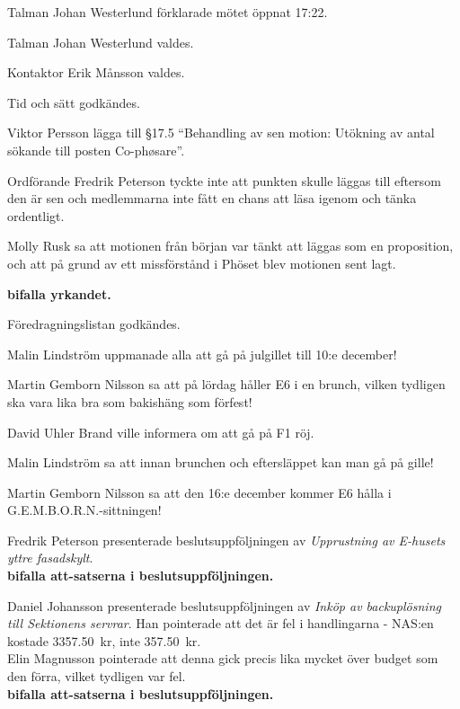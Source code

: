 \documentclass[10pt]{article}
\def\mo{Johan Westerlund}
\def\ms{Erik Månsson}
\begin{document}
\begin{paragrafer}
Talman {\mo} förklarade mötet öppnat 17:22.

Talman {\mo} valdes.

Kontaktor {\ms} valdes.

Tid och sätt godkändes.

\valavj


Viktor Persson \ypa lägga till \S17.5 ``Behandling av sen motion: Utökning av antal sökande till posten Co-phøsare''.

Ordförande Fredrik Peterson tyckte inte att punkten skulle läggas till eftersom den är sen och medlemmarna inte fått en chans att läsa igenom och tänka ordentligt.

Molly Rusk sa att motionen från början var tänkt att läggas som en proposition, och att på grund av ett missförstånd i Phöset blev motionen sent lagt.

\textbf{\Mba bifalla yrkandet.}

Föredragningslistan godkändes.


Malin Lindström uppmanade alla att gå på julgillet till 10:e december!

Martin Gemborn Nilsson sa att på lördag håller E6 i en brunch, vilken tydligen ska vara lika bra som bakishäng som förfest!

David Uhler Brand ville informera om att gå på F1 röj.

Malin Lindström sa att innan brunchen och eftersläppet kan man gå på gille!

Martin Gemborn Nilsson sa att den 16:e december kommer E6 hålla i G.E.M.B.O.R.N.-sittningen!

Fredrik Peterson presenterade beslutsuppföljningen av \emph{Upprustning av E-husets yttre fasadskylt}.\\
\textbf{\Mba bifalla att-satserna i beslutsuppföljningen.}

Daniel Johansson presenterade beslutsuppföljningen av \emph{Inköp av backuplösning till Sektionens servrar}. Han pointerade att det är fel i handlingarna - NAS:en kostade \SI{3357.50}{kr}, inte \SI{357.50}{kr}.\\
Elin Magnusson pointerade att denna gick precis lika mycket över budget som den förra, vilket tydligen var fel.\\ %
\textbf{\Mba bifalla att-satserna i beslutsuppföljningen.}


\end{paragrafer}
\end{document}
